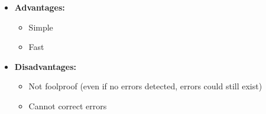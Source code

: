 \documentclass{article}
\begin{document}
\begin{itemize}
\begin{itemize}
\begin{itemize}
        \end{itemize}
        \item \textbf{Advantages:}
        \begin{itemize}
            \item Simple
            \item Fast
        \end{itemize}
        \item \textbf{Disadvantages:}
        \begin{itemize}
            \item Not foolproof (even if no errors detected, errors could still exist)
            \item Cannot correct errors
        \end{itemize}
    \end{itemize}


\end{itemize}
\end{document}
